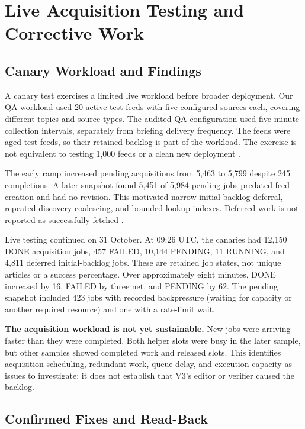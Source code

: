 \section{Live Acquisition Testing and Corrective Work}

\subsection{Canary Workload and Findings}

A canary test exercises a limited live workload before broader deployment. Our QA workload used 20 active test feeds with five configured sources each, covering different topics and source types. The audited QA configuration used five-minute collection intervals, separately from briefing delivery frequency. The feeds were aged test feeds, so their retained backlog is part of the workload. The exercise is not equivalent to testing 1,000 feeds or a clean new deployment \cite{canaryrecovery}.

The early ramp increased pending acquisitions from 5,463 to 5,799 despite 245 completions. A later snapshot found 5,451 of 5,984 pending jobs predated feed creation and had no revision. This motivated narrow initial-backlog deferral, repeated-discovery coalescing, and bounded lookup indexes. Deferred work is not reported as successfully fetched \cite{canaryrecovery}.

Live testing continued on 31 October. At 09:26 UTC, the canaries had 12,150 DONE acquisition jobs, 457 FAILED, 10,144 PENDING, 11 RUNNING, and 4,811 deferred initial-backlog jobs. These are retained job states, not unique articles or a success percentage. Over approximately eight minutes, DONE increased by 16, FAILED by three net, and PENDING by 62. The pending snapshot included 423 jobs with recorded backpressure (waiting for capacity or another required resource) and one with a rate-limit wait.

\textbf{The acquisition workload is not yet sustainable.} New jobs were arriving faster than they were completed. Both helper slots were busy in the later sample, but other samples showed completed work and released slots. This identifies acquisition scheduling, redundant work, queue delay, and execution capacity as issues to investigate; it does not establish that V3's editor or verifier caused the backlog.

\subsection{Confirmed Fixes and Read-Back}

